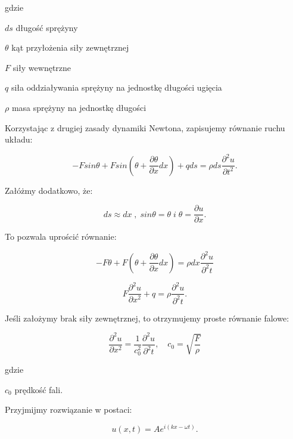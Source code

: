 gdzie
\begin{eqwhere}[2cm]
        \item[$ds$] długość sprężyny
        \item[$\theta$] kąt przyłożenia siły zewnętrznej
        \item[$F$] siły wewnętrzne
        \item[$q$] siła oddziaływania sprężyny na jednostkę długości ugięcia
        \item[$\rho$] masa sprężyny na jednostkę długości
\end{eqwhere}

Korzystając z drugiej zasady dynamiki Newtona, zapisujemy równanie ruchu układu:

\begin{equation}
-Fsin\theta+Fsin(\theta+\frac{\partial \theta}{\partial x}dx)+qds = \rho ds \frac{\partial^2u}{\partial t^2}.
\end{equation}

Załóżmy dodatkowo, że:

\begin{equation}
ds \approx dx\; ,\; sin\theta=\theta \; i\; \theta = \frac{\partial u}{\partial x}.
\end{equation}

To pozwala uprościć równanie:

\begin{equation}
-F\theta+F(\theta + \frac{\partial \theta}{\partial x}dx)=\rho dx\frac{\partial^2 u}{\partial^2 t}
\end{equation}

\begin{equation}
F\frac{\partial^2 u}{\partial x^2} + q = \rho \frac{\partial^2 u}{\partial^2 t}.
\end{equation}

Jeśli założymy brak siły zewnętrznej, to otrzymujemy proste równanie falowe:

\begin{equation}
\frac{\partial^2 u}{\partial x^2} = \frac{1}{c_0^2} \frac{\partial^2 u}{\partial^2 t},\quad c_0=\sqrt{\frac{F}{\rho}}
\end{equation}

gdzie
\begin{eqwhere}[2cm]
        \item[$c_0$] prędkość fali.
\end{eqwhere}

Przyjmijmy rozwiązanie w postaci:

\begin{equation}
u(x,t)=Ae^{i(kx-\omega t)}.
\end{equation}

